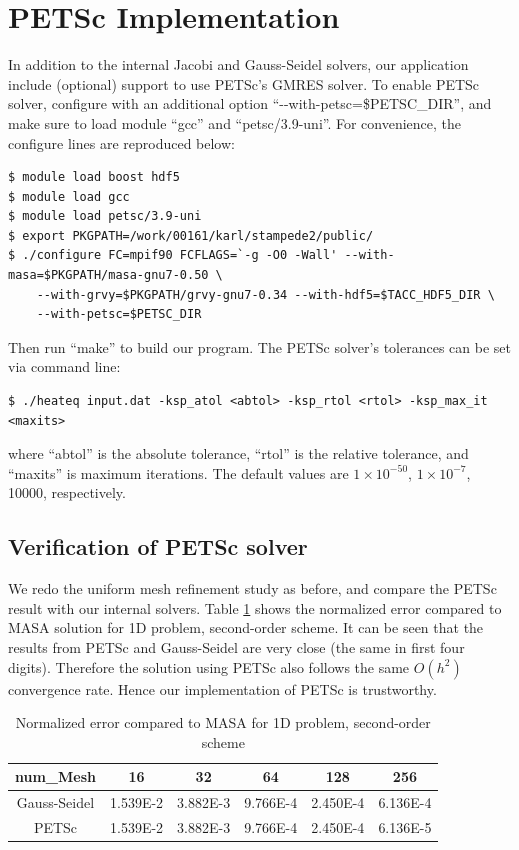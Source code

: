 \documentclass{article}
\begin{document}
\section{PETSc Implementation}
In addition to the internal Jacobi and Gauss-Seidel solvers, our application include (optional) support
to use PETSc's GMRES solver. To enable PETSc solver, configure with an additional option
``-{}-with-petsc=\$PETSC\_DIR'', and make sure to load module ``gcc'' and ``petsc/3.9-uni''. For convenience,
the configure lines are reproduced below:

\begin{verbatim}
$ module load boost hdf5
$ module load gcc 
$ module load petsc/3.9-uni
$ export PKGPATH=/work/00161/karl/stampede2/public/
$ ./configure FC=mpif90 FCFLAGS=`-g -O0 -Wall' --with-masa=$PKGPATH/masa-gnu7-0.50 \
    --with-grvy=$PKGPATH/grvy-gnu7-0.34 --with-hdf5=$TACC_HDF5_DIR \
    --with-petsc=$PETSC_DIR
\end{verbatim}
Then run ``make'' to build our program. The PETSc solver's tolerances can be set via command line:

\begin{verbatim}
$ ./heateq input.dat -ksp_atol <abtol> -ksp_rtol <rtol> -ksp_max_it <maxits>
\end{verbatim}
where ``abtol'' is the absolute tolerance, ``rtol'' is the relative tolerance, and ``maxits'' is maximum
iterations. The default values are $1\times 10^{-50}$, $1\times 10^{-7}$, 10000, respectively.

\subsection{Verification of PETSc solver}
We redo the uniform mesh refinement study as before, and compare the PETSc result with our internal solvers.
Table \ref{table:petsc_verification} shows the normalized error compared to MASA solution for 1D problem,
second-order scheme. It can be seen that the results from PETSc and Gauss-Seidel are very close (the same in
first four digits). Therefore the solution using PETSc also follows the same $O(h^2)$ convergence rate.
Hence our implementation of PETSc is trustworthy.

\begin{table}[h]
\centering
\begin{tabular}{c|c|c|c|c|c}
    \hline
    num\_Mesh & 16 & 32 & 64 & 128 & 256\\
    \hline
    Gauss-Seidel   & 1.539E-2 & 3.882E-3 & 9.766E-4 & 2.450E-4 & 6.136E-4     \\
    \hline
    PETSc   & 1.539E-2 & 3.882E-3 & 9.766E-4 & 2.450E-4 & 6.136E-5  \\
    \hline
\end{tabular}
\caption{Normalized error compared to MASA for 1D problem, second-order scheme}
\label{table:petsc_verification}
\end{table}
\end{document}
